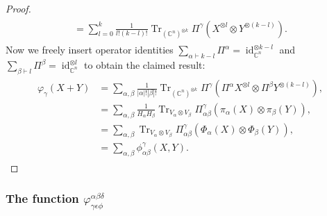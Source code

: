 \documentclass[pdflatex, sn-mathphys-num]{sn-jnl} %
\theoremstyle{plain}
\theoremstyle{definition}
\DeclareMathOperator{\Tr}{Tr}
\DeclareMathOperator{\id}{id}
\newcommand{\ot}{\otimes} %
\newcommand{\vp}{\varphi} %
\newcommand{\ya}{\alpha}
\newcommand{\yb}{\beta}
\newcommand{\yc}{\gamma}
\newcommand{\yd}{\delta}
\newcommand{\ye}{\epsilon}
\newcommand{\yf}{\phi}
\newcommand{\sya}{|\ya|}
\newcommand{\syb}{|\yb|}
\begin{document}
\begin{proof}
\begin{align}
\begin{split}
            = \sum_{l=0}^k \frac{1}{l! (k-l)!} \Tr_{(\mathbb{C}^n)^{\ot k}} \Pi^\yc (X^{\ot l} \ot Y^{\ot (k-l)}).
        \end{split}
    \end{align}
    Now we freely insert operator identities $\sum_{\ya \vdash k-l} \Pi^{\ya} = \id_{\mathbb C^n}^{\otimes k-l}$ and $\sum_{\yb \vdash l} \Pi^{\yb} = \id_{\mathbb C^n}^{\otimes l}$ to obtain the claimed result:
    \begin{align}
        \begin{split}
            \vp_\yc(X+Y)
            &= \sum_{\ya, \yb}  \frac{1}{\sya! \syb!} \Tr_{(\mathbb{C}^n)^{\ot k}} \Pi^\yc (\Pi^{\ya}X^{\ot l} \ot \Pi^{\yb} Y^{\ot (k-l)}), \\
            &= \sum_{\ya, \yb}  \frac{1}{H_\ya H_\yb} \Tr_{V_\ya \ot V_\yb} \Pi_{\ya \yb}^\yc  (\pi_\ya(X) \ot \pi_\yb(Y)), \\
            &= \sum_{\ya, \yb}  \Tr_{V_\ya \ot V_\yb} \Pi_{\ya \yb}^\yc  (\Phi_\ya(X) \ot \Phi_\yb(Y)), \\
            &= \sum_{\ya, \yb}  \yf_{\ya \yb}^\yc(X,Y).
        \end{split}
    \end{align}
\end{proof}

\subsubsection{The function \texorpdfstring{$\vp^{\ya \yb \yd}_{\yc \ye \yf}$}{phiabcdef}}
\end{document}
